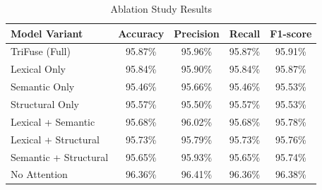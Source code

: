 \begin{table}[htbp]
\caption{Ablation Study Results}
\label{tab:ablation_full}
\centering
\begin{tabular}{|l|c|c|c|c|}
\hline
Model Variant & Accuracy & Precision & Recall & F1-score \\
\hline
TriFuse (Full) & 95.87\% & 95.96\% & 95.87\% & 95.91\% \\
Lexical Only & 95.84\% & 95.90\% & 95.84\% & 95.87\% \\
Semantic Only & 95.46\% & 95.66\% & 95.46\% & 95.53\% \\
Structural Only & 95.57\% & 95.50\% & 95.57\% & 95.53\% \\
Lexical + Semantic & 95.68\% & 96.02\% & 95.68\% & 95.78\% \\
Lexical + Structural & 95.73\% & 95.79\% & 95.73\% & 95.76\% \\
Semantic + Structural & 95.65\% & 95.93\% & 95.65\% & 95.74\% \\
No Attention & 96.36\% & 96.41\% & 96.36\% & 96.38\% \\
\hline
\end{tabular}
\end{table}